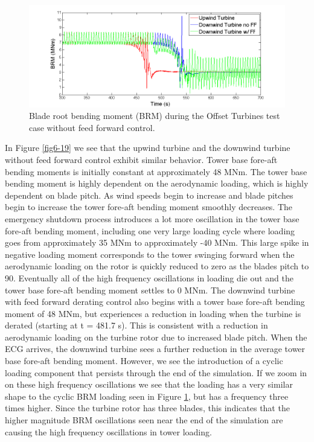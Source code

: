 \begin{figure}[ht] 
	\centering
		\includegraphics[width = \linewidth]{Figures/ch6Figures/fig6-18.png}

	\caption{Blade root bending moment (BRM) during the Offset Turbines test case without feed forward control.}
	\label{fig6-18}
\end{figure}


In Figure \ref{fig6-19} we see that the upwind turbine and the downwind turbine without feed forward control exhibit similar behavior. Tower base fore-aft bending moments is initially constant at approximately 48 MNm. The tower base bending moment is highly dependent on the aerodynamic loading, which is highly dependent on blade pitch. As wind speeds begin to increase and blade pitches begin to increase the tower fore-aft bending moment smoothly decreases. The emergency shutdown process introduces a lot more oscillation in the tower base fore-aft bending moment, including one very large loading cycle where loading goes from approximately 35 MNm to approximately -40 MNm. This large spike in negative loading moment corresponds to the tower swinging forward when the aerodynamic loading on the rotor is quickly reduced to zero as the blades pitch to 90\degree. Eventually all of the high frequency oscillations in loading die out and the tower base fore-aft bending moment settles to 0 MNm. The downwind turbine with feed forward derating control also begins with a tower base fore-aft bending moment of 48 MNm, but experiences a reduction in loading when the turbine is derated (starting at t = 481.7 s). This is consistent with a reduction in aerodynamic loading on the turbine rotor due to increased blade pitch. When the ECG arrives, the downwind turbine sees a further reduction in the average tower base fore-aft bending moment. However, we see the introduction of a cyclic loading component that persists through the end of the simulation. If we zoom in on these high frequency oscillations we see that the loading has a very similar shape to the cyclic BRM loading seen in Figure \ref{fig6-18}, but has a frequency three times higher. Since the turbine rotor has three blades, this indicates that the higher magnitude BRM oscillations seen near the end of the simulation are causing the high frequency oscillations in tower loading. 



